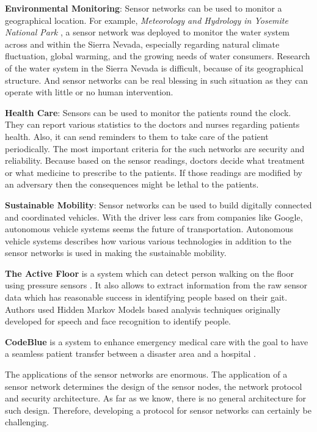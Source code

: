 	\textbf{Environmental Monitoring}: 
		Sensor networks can be used to monitor a geographical location. 
		For example, \textit{Meteorology and Hydrology in Yosemite National Park} \cite{lundquist2003meteorology}, a sensor network was deployed to monitor the water system across and within the Sierra Nevada, especially regarding natural climate fluctuation, global warming, and the growing needs of water consumers.
		Research of the water system in the Sierra Nevada is difficult, because of its geographical structure.
		And sensor networks can be real blessing in such situation as they can operate with little or no human intervention.
	
	\textbf{Health Care}:
		Sensors can be used to monitor the patients round the clock. 
		They can report various statistics to the doctors and nurses regarding patients health.
		Also, it can send reminders to them to take care of the patient periodically. 	
		The most important criteria for the such networks are security and reliability.
		Because based on the sensor readings, doctors decide what treatment or what medicine to prescribe to the patients.
		If those readings are modified by an adversary then the consequences might be lethal to the patients.

	\textbf{Sustainable Mobility}:
		Sensor networks can be used to build digitally connected and coordinated vehicles.
		With the driver less cars from companies like Google, autonomous vehicle systems seems the future of transportation.
		Autonomous vehicle systems \cite{benenson2008towards} describes how various various technologies in addition to the sensor networks is used in making the sustainable mobility.
	
	\textbf{The Active Floor} 
		is a system which can detect person walking on the floor using pressure sensors \cite{addlesee1997orl}.
		It also allows to extract information from the raw sensor data which has reasonable success in identifying people based on their gait.
		Authors used Hidden Markov Models based analysis techniques originally developed for speech and face recognition to identify people.
	
	\textbf{CodeBlue} 
		is a system to enhance emergency medical care with the goal to have a seamless patient transfer between a disaster area and a hospital\cite{lorincz2004sensor} .
	
	The applications of the sensor networks are enormous. 
	The application of a sensor network determines the design of the sensor nodes, the network protocol and security architecture.
	As far as we know, there is no general architecture for such design.
	Therefore, developing a protocol for sensor networks can certainly be challenging. 

